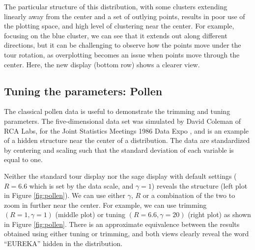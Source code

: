 \documentclass[]{interact}
\theoremstyle{plain}%
\theoremstyle{definition}
\theoremstyle{remark}
\begin{document}
The particular structure of this distribution, with some clusters
extending linearly away from the center and a set of outlying points,
results in poor use of the plotting space, and high level of clustering
near the center. For example, focusing on the blue cluster, we can see
that it extends out along different directions, but it can be
challenging to observe how the points move under the tour rotation, as
overplotting becomes an issue when points move through the center. Here,
the new display (bottom row) shows a clearer view.

\hypertarget{sec:appl4}{%
\subsection{Tuning the parameters: Pollen}\label{sec:appl4}}

The classical pollen data is useful to demonstrate the trimming and
tuning parameters. The five-dimensional data set was simulated by David
Coleman of RCA Labs, for the Joint Statistics Meetings 1986 Data Expo
\citep{pollen}, and is an example of a hidden structure near the center
of a distribution. The data are standardized by centering and scaling
such that the standard deviation of each variable is equal to one.

Neither the standard tour display nor the sage display with default
settings (\(R=6.6\) which is set by the data scale, and \(\gamma=1\))
reveals the structure (left plot in Figure \ref{fig:pollen}). We can use
either \(\gamma\), \(R\) or a combination of the two to zoom in further
near the center. For example, we can use trimming \((R=1, \gamma=1)\)
(middle plot) or tuning \((R=6.6,\gamma=20)\) (right plot) as shown in
Figure \ref{fig:pollen}. There is an approximate equivalence between the
results obtained using either tuning or trimming, and both views clearly
reveal the word ``EUREKA'' hidden in the distribution.
\end{document}
